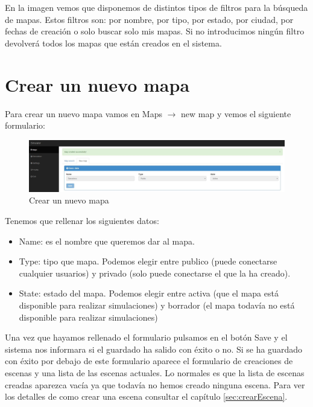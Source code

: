 En la imagen vemos que disponemos de distintos tipos de filtros para la búsqueda de mapas. Estos filtros son: por nombre, por tipo, por estado, por ciudad, por fechas de creación o solo buscar solo mis mapas. Si no introducimos ningún filtro devolverá todos los mapas que están creados en el sistema.

\newpage

\section{Crear un nuevo mapa}\label{sec:crearMapa}

Para crear un nuevo mapa vamos en Maps $\rightarrow$ new map y vemos el siguiente formulario:

\begin{figure}[H]
	\centering\includegraphics[scale=0.3]{imagenes/capitulo8/crear-un-nuevo-mapa.jpg}
	\caption{Crear un nuevo mapa}
	\label{img:AddMapa}
\end{figure}

Tenemos que rellenar los siguientes datos:

\begin{itemize}
	\item Name: es el nombre que queremos dar al mapa.
	\item Type: tipo que mapa. Podemos elegir entre publico (puede conectarse cualquier usuarios) y privado (solo puede conectarse el que la ha creado).
	\item State: estado del mapa. Podemos elegir entre activa (que el mapa está disponible para realizar simulaciones) y borrador (el mapa todavía no está disponible para realizar simulaciones)
\end{itemize}

Una vez que hayamos rellenado el formulario pulsamos en el botón Save y el sistema nos informara si el guardado ha salido con éxito o no. Si se ha guardado con éxito por debajo de este formulario aparece el formulario de creaciones de escenas y una lista de las escenas actuales. Lo normales es que la lista de escenas creadas aparezca vacía ya que todavía no hemos creado ninguna escena. Para ver los detalles de como crear una escena consultar el capítulo \ref{sec:crearEscena}.

